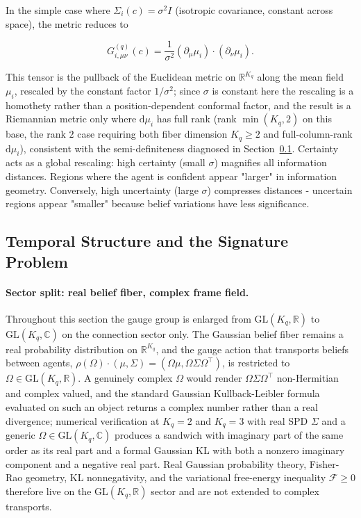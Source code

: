 \documentclass[11pt]{article}
\begin{document}
In the simple case where $\Sigma_i(c) = \sigma^2 I$ (isotropic covariance, constant across space), the metric reduces to

\begin{equation}
G^{(q)}_{i,\mu\nu}(c) = \frac{1}{\sigma^2}(\partial_\mu \mu_i) \cdot (\partial_\nu \mu_i).
\end{equation}

This tensor is the pullback of the Euclidean metric on $\mathbb{R}^{K_q}$ along the mean field $\mu_i$, rescaled by the constant factor $1/\sigma^2$; since $\sigma$ is constant here the rescaling is a homothety rather than a position-dependent conformal factor, and the result is a Riemannian metric only where $\mathrm{d}\mu_i$ has full rank (rank $\min(K_q,2)$ on this base, the rank $2$ case requiring both fiber dimension $K_q \ge 2$ and full-column-rank $\mathrm{d}\mu_i$), consistent with the semi-definiteness diagnosed in Section~\ref{sec:signature_resolution}. Certainty acts as a global rescaling: high certainty (small $\sigma$) magnifies all information distances. Regions where the agent is confident appear "larger" in information geometry. Conversely, high uncertainty (large $\sigma$) compresses distances - uncertain regions appear "smaller" because belief variations have less significance.

\subsection{Temporal Structure and the Signature Problem}
\label{sec:signature_resolution}

\paragraph{Sector split: real belief fiber, complex frame field.}
Throughout this section the gauge group is enlarged from $\mathrm{GL}(K_q, \mathbb{R})$ to $\mathrm{GL}(K_q, \mathbb{C})$ on the connection sector only. The Gaussian belief fiber remains a real probability distribution on $\mathbb{R}^{K_q}$, and the gauge action that transports beliefs between agents, $\rho(\Omega) \cdot (\mu, \Sigma) = (\Omega \mu, \Omega \Sigma \Omega^\top)$, is restricted to $\Omega \in \mathrm{GL}(K_q, \mathbb{R})$. A genuinely complex $\Omega$ would render $\Omega \Sigma \Omega^\top$ non-Hermitian and complex valued, and the standard Gaussian Kullback-Leibler formula evaluated on such an object returns a complex number rather than a real divergence; numerical verification at $K_q=2$ and $K_q=3$ with real SPD $\Sigma$ and a generic $\Omega \in \mathrm{GL}(K_q, \mathbb{C})$ produces a sandwich with imaginary part of the same order as its real part and a formal Gaussian KL with both a nonzero imaginary component and a negative real part. Real Gaussian probability theory, Fisher-Rao geometry, KL nonnegativity, and the variational free-energy inequality $\mathcal{F} \ge 0$ therefore live on the $\mathrm{GL}(K_q, \mathbb{R})$ sector and are not extended to complex transports.
\end{document}
